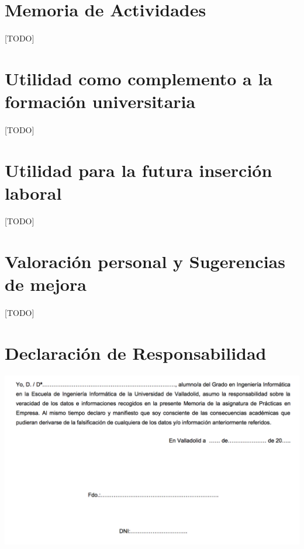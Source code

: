 \documentclass[a4paper,spanish]{article}
\begin{document}
  \section{Memoria de Actividades}

    \paragraph{}
    [TODO]


  \section{Utilidad como complemento a la formación universitaria}

    \paragraph{}
    [TODO]


  \section{Utilidad para la futura inserción laboral}

    \paragraph{}
    [TODO]


  \section{Valoración personal y Sugerencias de mejora}

    \paragraph{}
    [TODO]

  \newpage
   \section{Declaración de Responsabilidad}

       \includegraphics[width=\textwidth]{responsibility-declaration}
\end{document}
